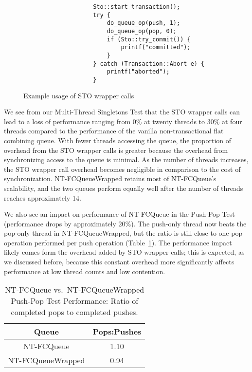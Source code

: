 \begin{figure}[ht!]
\centering
\singlespace
{}
	\begin{lstlisting}
                    Sto::start_transaction();
                    try {
                        do_queue_op(push, 1);
                        do_queue_op(pop, 0);
                        if (Sto::try_commit()) {
                            printf("committed");
                        }
                    } catch (Transaction::Abort e) {
                        printf("aborted");
                    }
	\end{lstlisting}
\caption{Example usage of STO wrapper calls}
\label{fig:wrappers}
\end{figure}

We see from our Multi-Thread Singletons Test that the STO wrapper calls can lead to a loss of performance ranging from 0\% at twenty threads to 30\% at four threads compared to the performance of the vanilla non-transactional flat combining queue. 
 With fewer threads accessing the queue, the proportion of overhead from the STO wrapper calls is greater because the overhead from synchronizing access to the queue is minimal. As the number of threads increases, the STO wrapper call overhead becomes negligible in comparison to the cost of synchronization.
NT-FCQueueWrapped retains most of NT-FCQueue's scalability, and the two queues perform equally well after the number of threads reaches approximately 14.

We also see an impact on performance of NT-FCQueue in the Push-Pop Test (performance drops by approximately 20\%). The push-only thread now beats the pop-only thread in NT-FCQueueWrapped, but the ratio is still close to one pop operation performed per push operation (Table~\ref{tab:nt_pop_push_ratio}). The performance impact likely comes form the overhead added by STO wrapper calls; this is expected, as we discussed before, because this constant overhead more significantly affects performance at low thread counts and low contention.

\begin{table}[ht!]
        \centering
    \begin{tabular}{|cc|}
        \hline
        Queue & Pops:Pushes\\
        \hline
            NT-FCQueue & 1.10\\
            NT-FCQueueWrapped & 0.94\\
        \hline
    \end{tabular}
    \caption{NT-FCQueue vs.\ NT-FCQueueWrapped Push-Pop Test Performance: Ratio of completed pops to completed pushes.}
    \label{tab:nt_pop_push_ratio}
\end{table}

